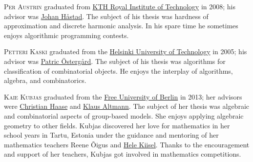 \documentclass{toc}
\begin{document}
%
%
%
%
%
%
%
%
%
%
%
%
%
%
\begin{tocaboutauthors}
\begin{tocabout}[austrin]  %
  \textsc{Per Austrin} graduated from
  \href{https://www.kth.se/}{KTH Royal Institute of Technology} in 2008;
  his advisor was %
  \href{https://people.kth.se/~johanh/}{Johan H\aa{}stad}.
  The subject of his thesis was
  hardness of approximation and discrete harmonic analysis.
  In his spare time he sometimes enjoys algorithmic programming contests.
\end{tocabout}

\begin{tocabout}[kaski]  %
\textsc{Petteri Kaski} graduated from the %
  \href{https://www.aalto.fi/en}{Helsinki University of Technology}
  in 2005;
his advisor was %
  \href{https://users.aalto.fi/~pat/}{Patric \"Osterg\aa{}rd}.
  The subject of his thesis was
  algorithms for classification of combinatorial objects. He enjoys 
  the interplay of algorithms, algebra, and combinatorics.
\end{tocabout}

\begin{tocabout}[kubjas]  %
  \textsc{Kaie Kubjas}
  graduated from the  %
  \href{https://www.fu-berlin.de/en/index.html}{Free University of Berlin}
  in 2013; her advisors were
   \href{https://www.mi.fu-berlin.de/en/math/groups/ag-diskret-algebra-geom/members/Professoren/christian_haase.html}{Christian Haase} 
   and %
   \href{http://www.math.fu-berlin.de/altmann/}{Klaus Altmann}. 
The subject of her thesis was algebraic and combinatorial aspects 
of group-based models.
    She enjoys applying algebraic geometry to other fields.
Kubjas discovered her love for mathematics in her school years in Tartu,
Estonia under the guidance and mentoring of her mathematics teachers 
Reene \~{O}igus and
\href{https://www.tartu.ee/et/tunnustatud-isikud/hele-kiisel}{%
Hele Kiisel}.  %
Thanks to the encouragement and support
of her teachers, Kubjas got involved in mathematics competitions.
\end{tocabout}
\end{tocaboutauthors}
\end{document}
